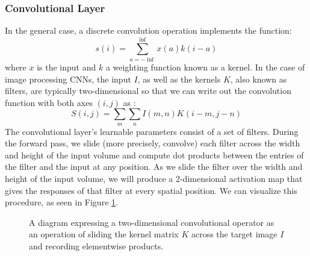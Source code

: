 \subsubsection{Convolutional Layer}
In the general case, a discrete convolution operation implements the function:
\begin{equation}
s(i)=\sum_{a=-\inf}^{\inf}x(a)k(i-a)
\label{eq:conv1}
\end{equation}
where $x$ is the input and $k$ a weighting function known as a kernel. In the case of image processing \acp{CNN}, the input $I$, as well as the kernels $K$, also known as filters, are typically two-dimensional so that we can write out  the convolution function with both axes $(i,j)$ as \parencite{stanford2020cs231n}:
\begin{equation}
S(i,j)=\sum_{m}\sum_{n}I(m,n)K(i-m,j-n)
\label{eq:conv2}
\end{equation}
The convolutional layer’s learnable parameters consist of a set of filters. During the forward pass, we slide (more precisely, convolve) each filter across the width and height of the input volume and compute dot products between the entries of the filter and the input at any position. As we slide the filter over the width and height of the input volume, we will produce a 2-dimensional activation map that gives the responses of that filter at every spatial position. We can visualize this procedure, as seen in Figure \ref{fig:conv}.
\begin{figure}[H]
	\centering
	\resizebox{0.6\textwidth}{!}{}
	\caption{A diagram expressing a two-dimensional convolutional operator as an operation of sliding the kernel matrix $K$ across the target image $I$ and recording elementwise products.}
	\label{fig:conv}
\end{figure}
